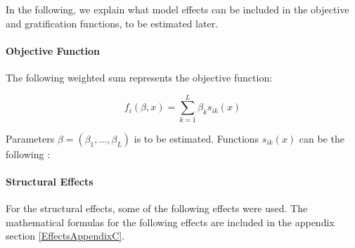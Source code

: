 \documentclass[12pt]{report}
\begin{document}
In the following, we explain what model effects can be included in the objective and gratification functions, to be estimated later.

\paragraph*{Objective Function}
The following weighted sum represents the objective function:

\begin{equation}
f_i(\beta, x) = \sum_{k = 1}^{L} \beta_k s_{ik}(x)
\end{equation}

Parameters $\beta = (\beta_1, ..., \beta_L)$ is to be estimated. Functions $s_{ik}(x)$ can be the following \cite{Snijders2004}:

\paragraph{Structural Effects}
For the structural effects, some of the following effects were used. The mathematical formulas for the following effects are included in the appendix section \ref{EffectsAppendixC}. 
\end{document}
